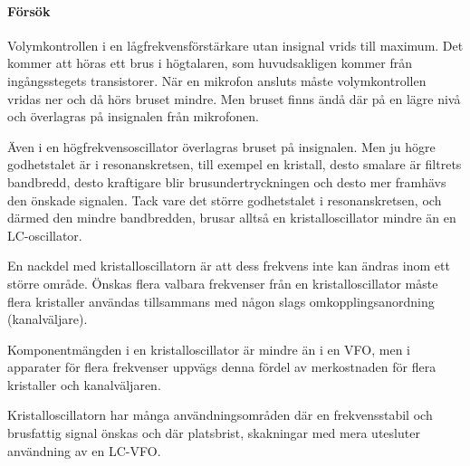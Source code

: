 \paragraph{Försök}

Volymkontrollen i en lågfrekvensförstärkare utan insignal vrids till maximum.
Det kommer att höras ett brus i högtalaren, som huvudsakligen kommer från
ingångsstegets transistorer.
När en mikrofon ansluts måste volymkontrollen vridas ner och då hörs bruset
mindre.
Men bruset finns ändå där på en lägre nivå och överlagras på insignalen från
mikrofonen.

Även i en högfrekvensoscillator överlagras bruset på insignalen.
Men ju högre godhetstalet är i resonanskretsen, till exempel en kristall, desto
smalare är filtrets bandbredd, desto kraftigare blir brusundertryckningen och
desto mer framhävs den önskade signalen.
Tack vare det större godhetstalet i resonanskretsen, och därmed den mindre
bandbredden, brusar alltså en kristalloscillator mindre än en LC-oscillator.

En nackdel med kristalloscillatorn är att dess frekvens inte kan ändras inom 
ett större område.
Önskas flera valbara frekvenser från en kristalloscillator måste flera
kristaller användas tillsammans med någon slags omkopplingsanordning
(kanalväljare).

Komponentmängden i en kristalloscillator är mindre än i en VFO, men i
apparater för flera frekvenser uppvägs denna fördel av merkostnaden
för flera kristaller och kanalväljaren.

Kristalloscillatorn har många användningsområden där en
frekvensstabil och brusfattig signal önskas och där platsbrist,
skakningar med mera utesluter användning av en LC-VFO.

